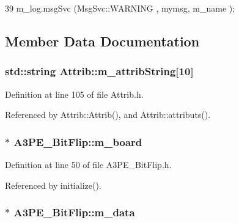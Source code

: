 \begin{DoxyCode}
39 { m_log.msgSvc (MsgSvc::WARNING , mymsg, m_name ); }
\end{DoxyCode}


\subsection{Member Data Documentation}
\hypertarget{classAttrib_a3414521d7a82476e874b25a5407b5e63}{
\subsubsection[{m\_\-attribString}]{\setlength{\rightskip}{0pt plus 5cm}std::string {\bf Attrib::m\_\-attribString}\mbox{[}10\mbox{]}}}
\label{classAttrib_a3414521d7a82476e874b25a5407b5e63}


Definition at line 105 of file Attrib.h.

Referenced by Attrib::Attrib(), and Attrib::attributs().\hypertarget{classA3PE__BitFlip_a2ade653b4fda5f531b5de28233cdb749}{
\subsubsection[{m\_\-board}]{$\ast$ {\bf A3PE\_\-BitFlip::m\_\-board}}}
\label{classA3PE__BitFlip_a2ade653b4fda5f531b5de28233cdb749}


Definition at line 50 of file A3PE\_\-BitFlip.h.

Referenced by initialize().\hypertarget{classA3PE__BitFlip_a06e7c01e11710261168bb0e12e2e4ac5}{
\subsubsection[{m\_\-data}]{$\ast$ {\bf A3PE\_\-BitFlip::m\_\-data}}}
\label{classA3PE__BitFlip_a06e7c01e11710261168bb0e12e2e4ac5}


